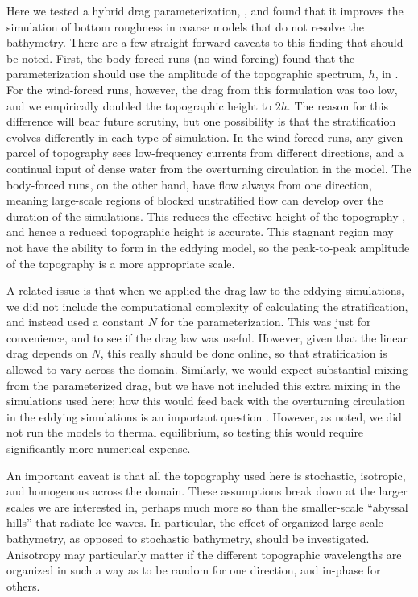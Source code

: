 \documentclass[twocol]{ametsocV5}
\begin{document}
Here we tested a  hybrid drag parameterization, , and found that it improves the simulation of bottom roughness in coarse models that do not resolve the bathymetry.  There are a few straight-forward caveats to this finding that should be noted.  First, the body-forced runs (no wind forcing) found that the parameterization  should use the amplitude of the topographic spectrum, $h$, in . For the wind-forced runs, however, the drag from this formulation was too low, and we empirically doubled the topographic height to $2h$.  The reason for this difference will bear future scrutiny, but one possibility is that the stratification evolves differently in each type of simulation.  In the wind-forced runs, any given parcel of topography sees low-frequency currents from different directions, and a continual input of dense water from the overturning circulation in the model.  The body-forced runs, on the other hand, have flow always from one direction, meaning large-scale regions of blocked unstratified flow can develop over the duration of the simulations.  This reduces the effective height of the topography \citep[i.e.][]{aguilarsutherland06}, and hence a reduced topographic height is accurate.  This stagnant region may not have the ability to form in the eddying model, so the peak-to-peak amplitude of the topography is a more appropriate scale.

A related issue is that when we applied the drag law to the eddying simulations, we did not include the computational complexity of calculating the stratification, and instead used a constant $N$ for the parameterization.  This was just for convenience, and to see if the drag law was useful.  However, given that the linear drag depends on $N$, this really should be done online, so that stratification is allowed to vary across the domain.   Similarly, we would expect substantial mixing from the parameterized drag, but we have not included this extra mixing in the simulations used here; how this would feed back with the overturning circulation in the eddying simulations is an important question \citep{broadbridgeetal16}. However, as noted, we did not run the models to thermal equilibrium, so testing this would require significantly more numerical expense.

An important caveat is that all the topography used here is stochastic, isotropic, and homogenous across the domain.   These assumptions break down at the larger scales we are interested in, perhaps much more so than the smaller-scale ``abyssal hills''  that radiate lee waves.  In particular, the effect of organized large-scale bathymetry, as opposed to stochastic bathymetry, should be investigated.  Anisotropy may particularly matter if the different topographic wavelengths are organized in such a way as to be random for one direction, and in-phase for others.
\end{document}
